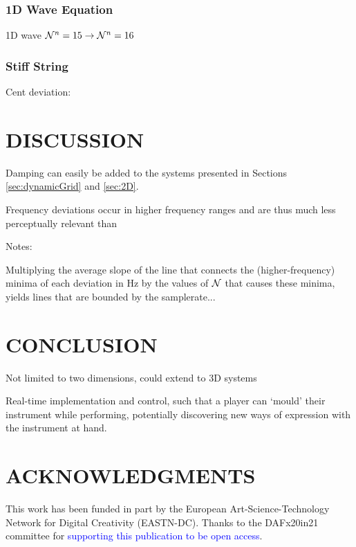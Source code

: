 \documentclass[fleqn]{jaes}
\def\SWcomment[#1]{\textcolor{blue}{#1}}
\begin{document}
\subsubsection{1D Wave Equation}

1D wave $\mathcal{N}^n = 15 \rightarrow \mathcal{N}^n = 16$ 

\subsubsection{Stiff String}

Cent deviation:
\section{DISCUSSION}\label{sec:discussion}
Damping can easily be added to the systems presented in Sections \ref{sec:dynamicGrid} and \ref{sec:2D}.

Frequency deviations occur in higher frequency ranges and are thus much less perceptually relevant than 

Notes:

Multiplying the average slope of the line that connects the (higher-frequency) minima of each deviation in Hz by the values of $\mathcal{N}$ that causes these minima, yields lines that are bounded by the samplerate...



\section{CONCLUSION}\label{sec:conclusion}
Not limited to two dimensions, could extend to 3D systems

Real-time implementation and control, such that a player can `mould' their instrument while performing, potentially discovering new ways of expression with the instrument at hand.   

\section{ACKNOWLEDGMENTS}
This  work  has  been  funded  in  part  by  the European Art-Science-Technology Network for Digital Creativity (EASTN-DC). Thanks to the DAFx20in21 committee for \SWcomment[supporting this publication to be open access].




\appendix
\end{document}
